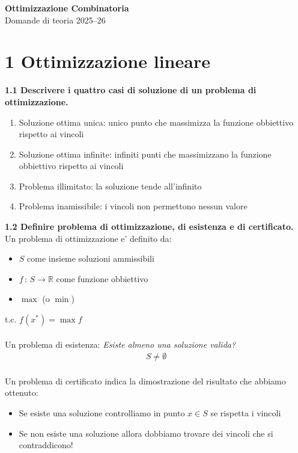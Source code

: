\documentclass[a4paper,11pt]{article}
\newcommand{\domanda}[2]{%
  \vspace{0.6em}
  \noindent\textbf{#1}\\[0.2em]
  \noindent#2
  \vspace{1em}
  \par
}
\begin{document}
\begin{center}
  {\LARGE\bfseries Ottimizzazione Combinatoria}\\[0.5em]
  {\large Domande di teoria 2025--26}
\end{center}

\vspace{1.5em}

\section{1 \quad Ottimizzazione lineare}

\domanda{1.1 \quad Descrivere i quattro casi di soluzione di un problema di ottimizzazione.}{
\begin{enumerate}
    \item Soluzione ottima unica: unico punto che massimizza la funzione obbiettivo rispetto ai vincoli
    \item Soluzione ottima infinite: infiniti punti che massimizzano la funzione obbiettivo rispetto ai vincoli
    \item Problema illimitato: la soluzione tende all'infinito
    \item Problema inamissibile: i vincoli non permettono nessun valore 
\end{enumerate}
}

\domanda{1.2 \quad Definire problema di ottimizzazione, di esistenza e di certificato.}{
Un problema di ottimizzazione e' definito da:
\begin{itemize}
    \item $S$ come insieme soluzioni ammissibili
    \item $f \, : \, S \to \mathbb{R}$ come funzione obbiettivo
    \item $\max$ (o $\min$)
\end{itemize}
t.c. $f(x^*) = \max f$\\
\vspace{1px}\\
Un problema di esistenza: \textit{Esiste almeno una soluzione valida?}
\begin{align*}
    S \neq \emptyset
\end{align*}
\vspace{1px}\\
Un problema di certificato indica la dimostrazione del risultato che abbiamo ottenuto:
\begin{itemize}
    \item Se esiste una soluzione controlliamo in punto $x \in S$ se rispetta i vincoli
    \item Se non esiste una soluzione allora dobbiamo trovare dei vincoli che si contraddicono!
\end{itemize}
}
\end{document}
